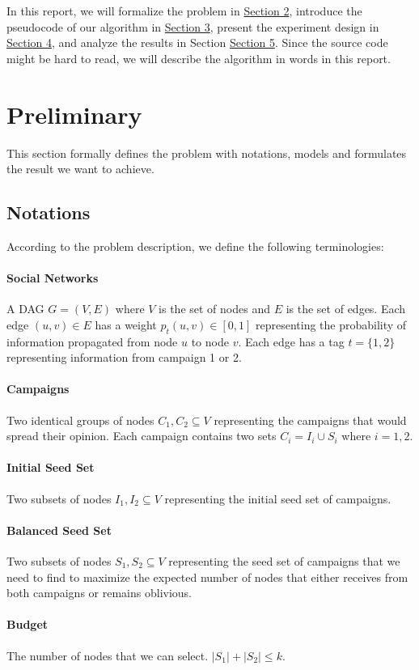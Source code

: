 \documentclass{article}
\begin{document}
In this report, we will formalize the problem in \hyperlink{section2}{Section 2}, introduce the pseudocode of our algorithm in \hyperlink{section3}{Section 3}, present the experiment design in \hyperlink{section4}{Section 4}, and analyze the results in Section \hyperlink{section5}{Section 5}. Since the source code might be hard to read, we will describe the algorithm in words in this report.

\section{Preliminary}
This section formally defines the problem with notations, models and formulates the result we want to achieve.

\subsection{Notations}
According to the problem description, we define the following terminologies:
\paragraph{Social Networks} A DAG $G = (V, E)$ where $V$ is the set of nodes and $E$ is the set of edges. Each edge $(u, v) \in E$ has a weight $p_t (u, v) \in [0, 1]$ representing the probability of information propagated from node $u$ to node $v$. Each edge has a tag $t = \{1, 2\}$ representing information from campaign 1 or 2.
\paragraph{Campaigns} Two identical groups of nodes $C_1, C_2 \subseteq V$ representing the campaigns that would spread their opinion. Each campaign contains two sets $C_i = I_i \cup S_i$ where $i = 1, 2$.
\paragraph{Initial Seed Set} Two subsets of nodes $I_1, I_2 \subseteq V$ representing the initial seed set of campaigns.
\paragraph{Balanced Seed Set} Two subsets of nodes $S_1, S_2 \subseteq V$ representing the seed set of campaigns that we need to find to maximize the expected number of nodes that either receives from both campaigns or remains oblivious.
\paragraph{Budget} The number of nodes that we can select. $|S_1| + |S_2| \leq k$.
\end{document}
